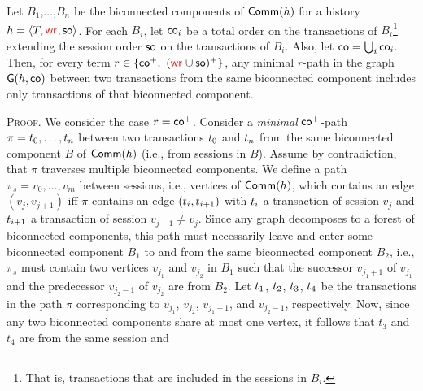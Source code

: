 \begin{lemma}\label{lem:comm_graph}
Let $B_1$,$\ldots$,$B_n$ be the biconnected components of $\mathsf{Comm}({h})$ for a history ${h} = {\left\langle{T, \textcolor{red}{\mathsf{wr}_{}}, \mathsf{so}}\right\rangle}$. 
For each $B_i$, let $\mathsf{co}_i$ be a total order on the transactions of $B_i$\footnote{That is, transactions that are included in the sessions in $B_i$.} extending the session order $\mathsf{so}$ on the transactions of $B_i$. Also, let $\mathsf{co}=\bigcup_i \mathsf{co}_i$.  
Then, for every term $r\in \{ \textsf{co}^+,\ (\textcolor{red}{\mathsf{wr}_{}} \cup \mathsf{so})^+\}$, any minimal $r$-path in the graph $\mathsf{G}({h},\mathsf{co})$
between two transactions from the same biconnected component includes only transactions of that biconnected component.
\end{lemma}
 \textsc{Proof.} We consider the case $r=\textsf{co}^+$.
 Consider a \emph{minimal} $\textsf{co}^+$-path $\pi={t}_0,\ldots,{t}_n$ %
 between two transactions ${t}_0$ and ${t}_n$ from the same biconnected component $B$ of $\mathsf{Comm}({h})$ (i.e., from sessions in $B$). 
 Assume by contradiction, that $\pi$ traverses multiple biconnected components.
 We define a path $\pi_s=v_0,\ldots,v_m$ between sessions, i.e., vertices of $\mathsf{Comm}({h})$, which contains an edge $(v_j,v_{j+1})$ iff $\pi$ contains an edge $({t}_i,{t}_{i+1})$ with ${t}_i$ a transaction of session $v_j$ and ${t}_{i+1}$ a transaction of session $v_{j+1}\neq v_j$. Since any graph decomposes to a forest of biconnected components, this path must necessarily leave and enter some biconnected component $B_1$ to and from the same biconnected component $B_2$, i.e., $\pi_s$ must contain two vertices $v_{j_1}$ and $v_{j_2}$ in $B_1$ such that the successor $v_{j_1+1}$ of $v_{j_1}$ and the predecessor $v_{j_2-1}$ of $v_{j_2}$ are from $B_2$. Let ${t}_1$, ${t}_2$, ${t}_3$, ${t}_4$ be the transactions in the path $\pi$ corresponding to $v_{j_1}$, $v_{j_2}$, $v_{j_1+1}$, and $v_{j_2-1}$, respectively. Now, since any two biconnected components share at most one vertex, it follows that $t_3$ and $t_4$ are from the same session and
